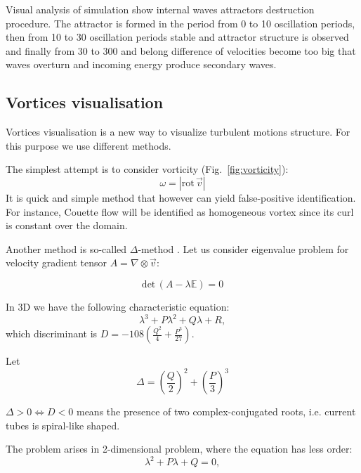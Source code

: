 \documentclass[a4wide,fontsize=12pt]{article}
\begin{document}
    Visual analysis of simulation show internal waves attractors destruction procedure. The attractor is formed in the period from 0 to 10 oscillation periods, then from 10 to 30 oscillation periods stable and attractor structure is observed and finally from 30 to 300 and belong difference of velocities become too big that waves overturn and incoming energy produce secondary waves.


\subsection{Vortices visualisation}

Vortices visualisation is a new way to visualize turbulent motions structure. For this purpose we use different methods.

The simplest attempt is to consider vorticity \cite{vortex} (Fig.~\ref{fig:vorticity}): $$\omega=|\textrm{rot}\,\vec{v}|$$
It is quick and simple method that however can yield false-positive identification. For instance, Couette flow will be identified as homogeneous vortex since its curl is constant over the domain.

Another method is so-called $\Delta$-method \cite{vortex}. Let us consider eigenvalue problem for velocity gradient tensor $A=\nabla\otimes  \vec v$:


\begin{equation}
  \text{det} \,( A -\lambda \mathbb E)=0
\end{equation}  

In 3D we have the following characteristic equation: $$\lambda^3+P\lambda^2+Q\lambda+R,$$ \noindent which discriminant is $D=-108\left( \frac{Q^2}{4} +\frac{P^3}{27}\right)$. 


Let $$\Delta=\left(\frac{Q}{2}\right)^2 +\left(\frac{P}{3}\right)^3$$

$ \Delta > 0  \Leftrightarrow  D < 0$ means the presence of two complex-conjugated roots, i.e. current tubes is spiral-like shaped.

The problem arises in 2-dimensional problem, where the equation has less order:
$$\lambda^2+P\lambda+Q=0,$$
\end{document}

